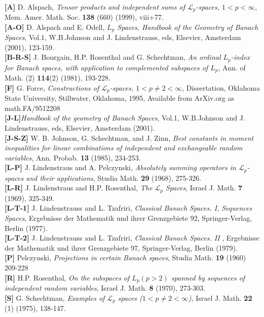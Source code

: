 \documentclass[12pt]{amsart}
\theoremstyle{definition}
\theoremstyle{remark}
\numberwithin{equation}{section}
\begin{document}
   
{}\\
{\bf{[A]}}\; D. Alspach, \textit{Tensor products and independent sums of 
${\mathcal{L}}_p$-spaces, $1<p<\infty$},
Mem. Amer. Math. Soc. {\bf{138}} (660) (1999), viii+77.\\
{\bf{[A-O]}}\; D. Alspach and E. Odell, \textit{$L_p$ Spaces, Handbook of the
Geometry of Banach Spaces}, Vol.1, W.B.Johnson and J. Lindenstrauss,
eds, Elsevier, Amsterdam (2001), 123-159.\\
{\bf{[B-R-S]}}\; J. Bourgain, H.P. Rosenthal and G. Schechtman,\textit{ An
ordinal $L_p$-index for Banach spaces, with application to
complemented subspaces of $L_p$}, Ann. of Math. (2) {\bf{114}}(2)
(1981), 193-228.\\
{\bf{[F]}}\; G. Force, \textit{Constructions of ${\mathcal{L}}_p$-spaces,
$1<p\ne 2< \infty$}, Dissertation, Oklahoma State University,
Stillwater, Oklahoma, 1995, Available from ArXiv.org as math.FA/9512208\\
{\bf{[J-L]}}\;\textit{Handbook of the geometry of Banach Spaces},
 Vol.1, W.B.Johnson and J. Lindenstrauss,
eds, Elsevier, Amsterdam (2001).\\
{\bf{[J-S-Z]}}\; W. B. Johnson, G. Schechtman, and J. Zinn,
  \textit{Best constants in moment inequalities for linear
  combinations of independent and exchangeable random variables,}
  Ann. Probab. {\bf{13}} (1985), 234-253.\\
{\bf{[L-P]}}\; J. Lindenstraus and A. Pelczynski,\textit{ Absolutely summing
operators in ${\mathcal{L}}_p$-spaces and their applications}, Studia
Math. {\bf{29}} (1968), 275-326.\\
{\bf{[L-R]}}\;  J. Lindenstraus and  H.P. Rosenthal, \textit{The
${\mathcal{L}}_p$ Spaces}, Israel J. Math. {\bf{7}} (1969), 325-349.\\
{\bf{[L-T-1]}}\; J. Lindenstrauss and L. Tzafriri,\textit{ Classical Banach
Spaces. I, Sequences Spaces}, Ergebnisse der Mathematik und ihrer 
Grenzgebiete 92, Springer-Verlag, Berlin (1977).\\
{\bf{[L-T-2]}}\; J. Lindenstrauss and L. Tzafriri,\textit{ Classical Banach
Spaces. II }, Ergebnisse der Mathematik und ihrer 
Grenzgebiete 97, Springer-Verlag, Berlin (1979).\\
{\bf{[P]}}\; Pelczynski, \textit{Projections in certain Banach
  spaces}, Studia Math. {\bf{19}} (1960) 209-228 \\
{\bf{[R]}}\; H.P. Rosenthal,\textit{ On the subspaces of $L_p(p>2)$ spanned by 
sequences of independent random variables}, Israel J. Math. {\bf{8}}
(1970), 273-303.\\
{\bf{[S]}}\; G. Schechtman,\textit{ Examples of ${\mathcal{L}}_p$ spaces 
($1<p\ne 2 <\infty$)}, Israel J. Math. {\bf{22}} (1) (1975),
  138-147.
\end{document}
